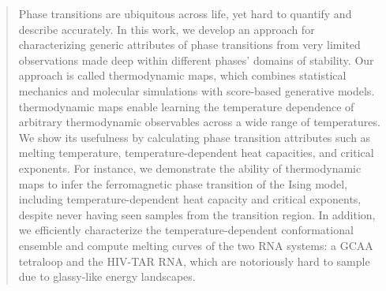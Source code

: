 \documentclass[9pt,twocolumn,twoside]{pnas-new}
\begin{document}

\begin{abstract}
Phase transitions are ubiquitous across life, yet hard to quantify and describe accurately. In this work, we develop an approach for characterizing generic attributes of phase transitions from very limited observations made deep within different phases' domains of stability. Our approach is called thermodynamic maps, which combines statistical mechanics and molecular simulations with score-based generative models. thermodynamic maps enable learning the temperature dependence of arbitrary thermodynamic observables across a wide range of temperatures. We show its usefulness by calculating phase transition attributes such as melting temperature, temperature-dependent heat capacities, and critical exponents. For instance, we demonstrate the ability of thermodynamic maps to infer the ferromagnetic phase transition of the Ising model, including temperature-dependent heat capacity and critical exponents, despite never having seen samples from the transition region. In addition, we efficiently characterize the temperature-dependent conformational ensemble and compute melting curves of the two RNA systems: a GCAA tetraloop and the HIV-TAR RNA, which are notoriously hard to sample due to glassy-like energy landscapes.
\end{abstract}



\maketitle
\thispagestyle{firststyle}

\end{document}
